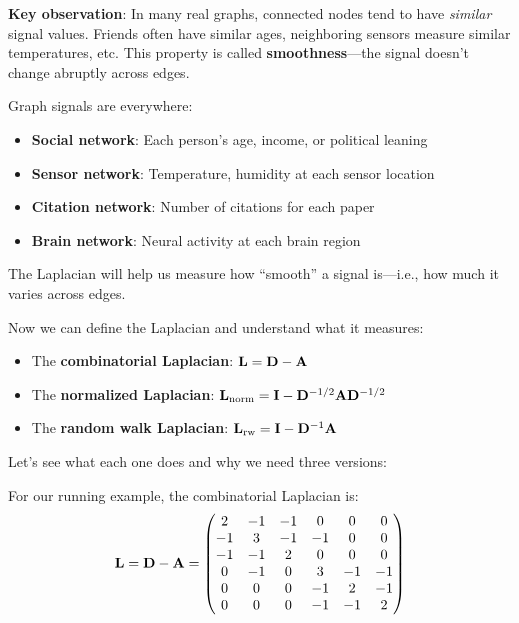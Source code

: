 \begin{notechapter}
\begin{example}
\textbf{Key observation}: In many real graphs, connected nodes tend to have \emph{similar} signal values. Friends often have similar ages, neighboring sensors measure similar temperatures, etc. This property is called \textbf{smoothness}---the signal doesn't change abruptly across edges.
\end{example}

\begin{intuition}
Graph signals are everywhere:
\begin{itemize}
    \item \textbf{Social network}: Each person's age, income, or political leaning
    \item \textbf{Sensor network}: Temperature, humidity at each sensor location
    \item \textbf{Citation network}: Number of citations for each paper
    \item \textbf{Brain network}: Neural activity at each brain region
\end{itemize}
The Laplacian will help us measure how ``smooth'' a signal is---i.e., how much it varies across edges.
\end{intuition}

Now we can define the Laplacian and understand what it measures:

\begin{definition}
\leavevmode
\begin{itemize}
    \item The \textbf{combinatorial Laplacian}: $\mathbf{L} = \mathbf{D} - \mathbf{A}$
    \item The \textbf{normalized Laplacian}: $\mathbf{L}_{\text{norm}} = 
    \mathbf{I} - \mathbf{D}^{-1/2} \mathbf{A} \mathbf{D}^{-1/2}$
    \item The \textbf{random walk Laplacian}: $\mathbf{L}_{\text{rw}} = \mathbf{I} - \mathbf{D}^{-1} \mathbf{A}$
\end{itemize}
\end{definition}

Let's see what each one does and why we need three versions:

\begin{example}
For our running example, the combinatorial Laplacian is:
\[
\mathbf{L} = \mathbf{D} - \mathbf{A} = \begin{pmatrix}
2 & -1 & -1 & 0 & 0 & 0 \\
-1 & 3 & -1 & -1 & 0 & 0 \\
-1 & -1 & 2 & 0 & 0 & 0 \\
0 & -1 & 0 & 3 & -1 & -1 \\
0 & 0 & 0 & -1 & 2 & -1 \\
0 & 0 & 0 & -1 & -1 & 2
\end{pmatrix}
\]


\end{example}
\end{notechapter}
